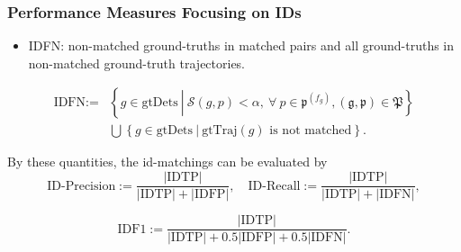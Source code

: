 \documentclass[slidetop, mathserif, dvipsnames]{beamer}
\begin{document}
\begin{frame}
	\frametitle{Performance Measures Focusing on IDs}
	\begin{itemize}
		\item IDFN:
		      non-matched ground-truths in matched pairs and
		      all ground-truths in non-matched ground-truth trajectories.
	\end{itemize}

	\vspace{-15pt}
	\begin{align*}
		\text{IDFN} := & \left\{ g\in\text{gtDets}\ \left|\                                                
		\mathcal S(g,p)<\alpha, \ 
		\forall\ p\in\mathfrak p^{(f_g)},
		(\mathfrak g,\mathfrak p)\in\mathfrak P
		\right.
		\right\} \\
		               & \bigcup \left\{g \in \text{gtDets}\ |\ \text{gtTraj$(g)$ is not matched}\right\}. 
	\end{align*}
	
	By these quantities, the id-matchings can be evaluated by
	\[
		\text{ID-Precision} := \dfrac{|\text{IDTP}|}{|\text{IDTP}| + |\text{IDFP}|},
		\quad
		\text{ID-Recall} := \dfrac{|\text{IDTP}|}{|\text{IDTP}| + |\text{IDFN}|},
	\]

	\vspace{-10pt}
	\[
		\text{IDF1} := \dfrac{|\text{IDTP}|}{|\text{IDTP}| + 0.5|\text{IDFP}| + 0.5|\text{IDFN}|}.
	\]
\end{frame}
\end{document}

